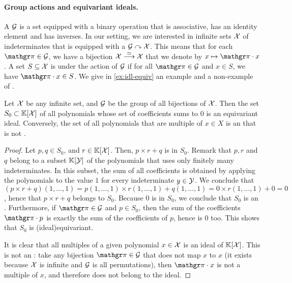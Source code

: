 \paragraph{Group actions and equivariant ideals.}  A  $\mathcal{G}$ is
a set equipped with a binary operation that is associative, has an identity
element and has inverses. In our setting, we are interested in infinite sets
$\mathcal{X}$ of indeterminates that is equipped with a  $\mathcal{G}
\curvearrowright \mathcal{X}$. This means that for each $\gelem \in \group$, we have a bijection
$\mathcal{X} \stackrel{\simeq}{\longrightarrow} \mathcal{X}$ that we denote by $x \mapsto \gelem  \cdot x$. A set $S
\subseteq \mathcal{X}$ is  under the action of $\mathcal{G}$ if for all
$\gelem \in \group$ and $x \in S$, we have $\gelem \cdot x \in S$. We give in
\cref{ex:idl-equiv} an example and a non-example of .

\begin{example}
    \label{ex:idl-equiv}
    Let $\mathcal{X}$ be any infinite set, and $\mathcal{G}$ be the 
    group of all bijections of $\mathcal{X}$. 
    Then the set $S_0 \subset \mathbb{K}[\mathcal{X}]$ of all polynomials 
    whose set of coefficients sums to $0$ is an equivariant ideal.
    Conversely, the set of all polynomials that are multiple
    of $x \in X$ is an  that is not .
\end{example}
\begin{proof}
    Let $p,q\in S_0$, and $r \in \mathbb{K}[\mathcal{X}]$.
    Then, $p \times r + q$ is in $S_0$. Remark that 
    $p,r$ and $q$ belong to a subset $\mathbb{K}[\mathcal{Y}]$ of the 
    polynomials that uses only finitely many indeterminates.
    In this subset, the sum of all coefficients is obtained
    by applying the polynomials to the value $1$ for every indeterminate
    $y \in \mathcal{Y}$. We conclude that
    $(p \times r + q)(1,\dots, 1) 
    = p(1,\dots,1) \times r(1,\dots,1) + q(1,\dots,1)
    = 0 \times r(1, \dots, 1) + 0 = 0$, hence that
    $p \times r + q$ belongs to $S_0$. 
    Because $0$ is in $S_0$, we conclude that $S_0$ is an .
    Furthermore, if $\gelem \in \group$ and $p \in S_0$, then
    the sum of the coefficients $\gelem \cdot p$ is exactly
    the sum of the coefficients of $p$, hence is $0$ too.
    This shows that $S_0$ is \kl(ideal){equivariant}.

    It is clear that all multiples of a given polynomial $x \in \mathcal{X}$
    is an ideal of $\mathbb{K}[\mathcal{X}]$. This is not an :
    take any bijection $\gelem \in \group$ that does not map $x$ to $x$ (it
    exists because $\mathcal{X}$ is infinite and $\mathcal{G}$ is all permutations),
    then $\gelem \cdot x$ is not a multiple of $x$, and therefore does 
    not belong to the ideal.
\end{proof}

